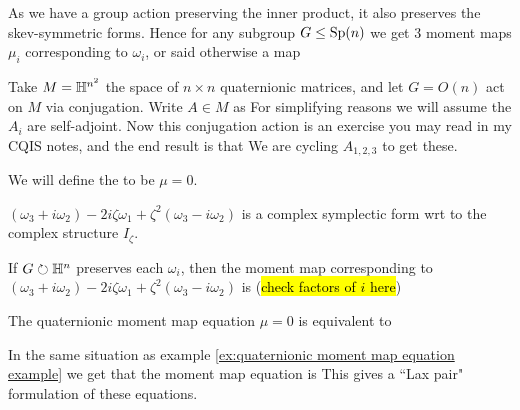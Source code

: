 \documentclass{article}
\begin{document}
As we have a group action preserving the inner product, it also preserves the skev-symmetric forms. Hence for any subgroup $G \leq \operatorname{Sp}(n)$ we get $3$ moment maps $\mu_i$ corresponding to $\omega_i$, or said otherwise a map 
\begin{example}\label{ex:quaternionic moment map equation example}
	Take $M = \mathbb{H}^{n^2}$ the space of $n\times n$ quaternionic matrices, and let $G=O(n)$ act on $M$ via conjugation. Write $A \in M$ as 
For simplifying reasons we will assume the $A_i$ are self-adjoint. Now this conjugation action is an exercise you may read in my CQIS notes, and the end result is that 
We are cycling $A_{1,2,3}$ to get these. 
\end{example}

\begin{definition}
	We will define the  to be $\mu =0$. 
\end{definition}

\begin{lemma}
	$(\omega_3+i\omega_2) -2i\zeta\omega_1 + \zeta^2 (\omega_3-i\omega_2)$ is a complex symplectic form wrt to the complex structure $I_\zeta$. 
\end{lemma}
\begin{lemma}
	If $G \circlearrowright \mathbb{H}^n$ preserves each $\omega_i$, then the moment map corresponding to $(\omega_3+i\omega_2) -2i\zeta\omega_1 + \zeta^2 (\omega_3-i\omega_2)$ is 
(\hl{check factors of $i$ here})
\end{lemma}

\begin{prop}
	The quaternionic moment map equation $\mu=0$ is equivalent to 
\end{prop}

\begin{example}
	In the same situation as example \ref{ex:quaternionic moment map equation example} we get that the moment map equation is 
This gives a ``Lax pair" formulation of these equations. 
\end{example}
\end{document}
